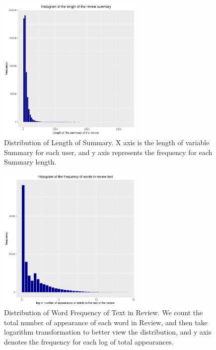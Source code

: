 \documentclass[letterpaper]{article} %
\begin{document}
\begin{figure}[!h]
\centering
\includegraphics[height=7cm,width=0.9\columnwidth]{pics//plot_r_len.pdf} 
\caption{Distribution of Length of Summary. X axis is the length of variable Summary for each user, and y axis represents the frequency for each Summary length.}
\label{Summary Length}
\end{figure}

\begin{figure}[!h]
\centering
\includegraphics[height=7cm,width=0.9\columnwidth]{pics//plot_t_freq.pdf}  
\caption{Distribution of Word Frequency of Text in Review. We count the total number of appearance of each word in Review, and then take logarithm transformation to better view the distribution, and y axis denotes the frequency for each log of total appearances.}
\label{Review Frequency}
\end{figure}
\end{document}

